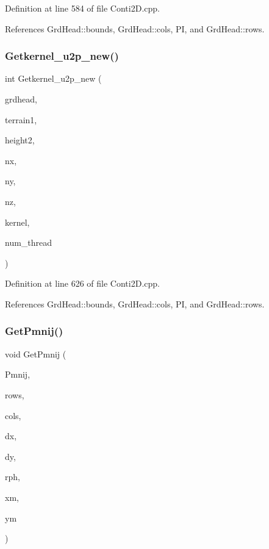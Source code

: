 Definition at line 584 of file Conti2\+D.\+cpp.



References Grd\+Head\+::bounds, Grd\+Head\+::cols, PI, and Grd\+Head\+::rows.

\mbox{\label{Conti2D_8cpp_aa99f45e33c5a1a8c605bbd31056347c7_aa99f45e33c5a1a8c605bbd31056347c7}} 
\subsubsection{Getkernel\+\_\+u2p\+\_\+new()}
{\footnotesize\ttfamily int Getkernel\+\_\+u2p\+\_\+new (\begin{DoxyParamCaption}\item[{\textbf{ Grd\+Head}}]{grdhead,  }\item[{double $\ast$}]{terrain1,  }\item[{double}]{height2,  }\item[{double $\ast$}]{nx,  }\item[{double $\ast$}]{ny,  }\item[{double $\ast$}]{nz,  }\item[{double $\ast$$\ast$}]{kernel,  }\item[{int}]{num\+\_\+thread }\end{DoxyParamCaption})}



Definition at line 626 of file Conti2\+D.\+cpp.



References Grd\+Head\+::bounds, Grd\+Head\+::cols, PI, and Grd\+Head\+::rows.

\mbox{\label{Conti2D_8cpp_a4bb34ae88cf16e429505f9eb746384cd_a4bb34ae88cf16e429505f9eb746384cd}} 
\subsubsection{Get\+Pmnij()}
{\footnotesize\ttfamily void Get\+Pmnij (\begin{DoxyParamCaption}\item[{double $\ast$}]{Pmnij,  }\item[{int}]{rows,  }\item[{int}]{cols,  }\item[{double}]{dx,  }\item[{double}]{dy,  }\item[{double}]{rph,  }\item[{double}]{xm,  }\item[{double}]{ym }\end{DoxyParamCaption})}



